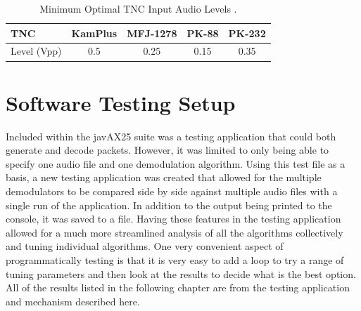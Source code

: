 \begin{table}
	\begin{center}
		\begin{tabular}{ | l | c | c | c | c | }
         \hline
			TNC & KamPlus & MFJ-1278 & PK-88 & PK-232 \\ \hline
			Level (Vpp) & 0.5 & 0.25 & 0.15 & 0.35 \\ \hline
		\end{tabular}
		\caption{Minimum Optimal TNC Input Audio Levels \cite{KamPlusGettingStarted,MFJ1278Man,PK88Man,Inc.2001}.}
		\label{TNCAudioLevels}
	\end{center}
\end{table}

\section{Software Testing Setup}
Included within the javAX25 suite was a testing application that could both generate and decode packets. However, it was limited to only being able to specify one audio file and one demodulation algorithm. Using this test file as a basis, a new testing application was created that allowed for the multiple demodulators to be compared side by side against multiple audio files with a single run of the application. In addition to the output being printed to the console, it was saved to a file. Having these features in the testing application allowed for a much more streamlined analysis of all the algorithms collectively and tuning individual algorithms. One very convenient aspect of programmatically testing is that it is very easy to add a loop to try a range of tuning parameters and then look at the results to decide what is the best option. All of the results listed in the following chapter are from the testing application and mechanism described here.
